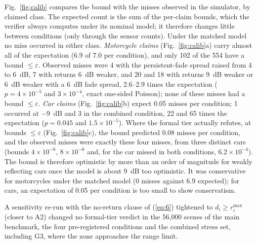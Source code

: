 Fig.~\ref{fig:calib} compares the bound with the misses observed in the simulator, by claimed class. The expected count is the sum of the per-claim bounds, which the verifier always computes under its nominal model; it therefore changes little between conditions (only through the sensor counts). Under the matched model no miss occurred in either class. \emph{Motorcycle claims} (Fig.~\ref{fig:calib}a) carry almost all of the expectation (6.9 of 7.0 per condition), and only 102 of the 554 have a bound $\le \varepsilon$. Observed misses were 4 with the persistent-fade spread raised from 4 to 6~dB, 7 with returns 6~dB weaker, and 20 and 18 with returns 9~dB weaker or 6~dB weaker with a 6~dB fade spread, 2.6--2.9 times the expectation ($p = 4 \times 10^{-5}$ and $3 \times 10^{-4}$, exact one-sided Poisson); none of these misses had a bound $\le \varepsilon$. \emph{Car claims} (Fig.~\ref{fig:calib}b) expect 0.05 misses per condition; 1 occurred at $-9$~dB and 3 in the combined condition, 22 and 65 times the expectation ($p = 0.045$ and $1.5 \times 10^{-5}$). Where the formal tier actually refutes, at bounds $\le \varepsilon$ (Fig.~\ref{fig:calib}c), the bound predicted 0.08 misses per condition, and the observed misses were exactly these four misses, from three distinct cars (bounds $4 \times 10^{-6}$, $8 \times 10^{-6}$ and, for the car missed in both conditions, $6.2 \times 10^{-4}$). The bound is therefore optimistic by more than an order of magnitude for weakly reflecting cars once the model is about 9~dB too optimistic. It was conservative for motorcycles under the matched model (0 misses against 6.9 expected); for cars, an expectation of 0.05 per condition is too small to show conservatism.

A sensitivity re-run with the no-return clause of (\ref{eq:6}) tightened to $d_i \ge r_i^{\max}$ (closer to A2) changed no formal-tier verdict in the 56,000 scenes of the main benchmark, the four pre-registered conditions and the combined stress set, including G3, where the zone approaches the range limit.

